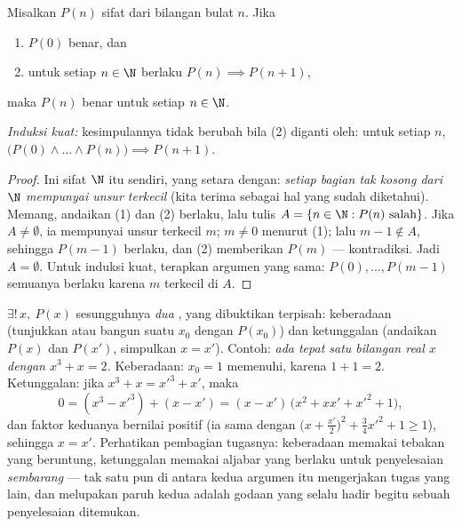 \begin{theorem}\label{thm:b1:logic:induction}
Misalkan $P(n)$ sifat dari bilangan bulat $n$. Jika
\begin{enumerate}
  \item $P(0)$ benar, dan
  \item untuk setiap $n \in \N$ berlaku $P(n) \implies P(n+1)$,
\end{enumerate}
maka $P(n)$ benar untuk setiap $n \in \N$.

\emph{Induksi kuat:} kesimpulannya tidak berubah bila (2) diganti
oleh: untuk setiap $n$, $\bigl(P(0) \land \dots \land P(n)\bigr)
\implies P(n+1)$.
\end{theorem}

\begin{proof}
Ini sifat $\N$ itu sendiri, yang setara dengan: \emph{setiap 
bagian tak kosong dari $\N$ mempunyai unsur terkecil} (kita terima
sebagai hal yang sudah diketahui). Memang, andaikan (1) dan (2)
berlaku, lalu tulis $A = \{n \in \N : P(n)
\text{ salah}\}$. Jika $A \neq \emptyset$, ia mempunyai unsur terkecil
$m$; $m \neq 0$ menurut (1); lalu $m - 1 \notin A$, sehingga $P(m-1)$
berlaku, dan (2) memberikan $P(m)$ --- kontradiksi. Jadi
$A = \emptyset$. Untuk induksi kuat, terapkan argumen yang sama:
$P(0), \dots, P(m-1)$ semuanya berlaku karena $m$ terkecil di $A$.
\end{proof}

\begin{example}\label{ex:b1:logic:uniqueexistence}
 $\exists!\,x,\ P(x)$ sesungguhnya \emph{dua} ,
yang dibuktikan terpisah: keberadaan (tunjukkan atau bangun suatu
$x_0$ dengan $P(x_0)$) dan ketunggalan (andaikan $P(x)$ dan $P(x')$,
simpulkan $x =
x'$). Contoh: \emph{ada tepat satu bilangan real $x$ dengan $x^3 + x =
2$.} Keberadaan: $x_0 = 1$ memenuhi, karena $1 + 1 = 2$. Ketunggalan:
jika $x^3 + x = x'^3 + x'$, maka
\[
0 = (x^3 - x'^3) + (x - x')
= (x - x')\,\bigl(x^2 + xx' + x'^2 + 1\bigr),
\]
dan faktor keduanya bernilai positif (ia sama dengan $\bigl(x +
\tfrac{x'}2\bigr)^2 + \tfrac34 x'^2 + 1 \geq 1$), sehingga $x = x'$.
Perhatikan pembagian tugasnya: keberadaan memakai tebakan yang
beruntung, ketunggalan memakai aljabar yang berlaku untuk penyelesaian
\emph{sembarang} --- tak satu pun di antara kedua argumen itu
mengerjakan tugas yang lain, dan melupakan paruh kedua adalah godaan
yang selalu hadir begitu sebuah penyelesaian ditemukan.
\end{example}

